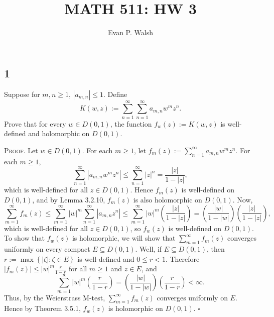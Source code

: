 \documentclass[12pt]{article}
\title{MATH 511: HW 3}
\author{Evan P. Walsh}
\newcounter{ProofCounter}
\newenvironment{Proof}{\stepcounter{ProofCounter}\textsc{Proof.}}{\hfill$\square$}
\begin{document}
\maketitle

\subsection*{1}
\begin{tcolorbox}
Suppose for $m,n \geq 1$, $|a_{m,n}| \leq 1$. Define 
\[ K(w,z) := \sum_{n=1}^{\infty}\sum_{n=1}^{\infty}a_{m,n}w^{m}z^{n}. \]
Prove that for every $w \in D(0,1)$, the function $f_{w}(z) := K(w,z)$ is well-defined and holomorphic on $D(0,1)$.
\end{tcolorbox}
\begin{Proof}
Let $w \in D(0,1)$. For each $m \geq 1$, let $f_{m}(z) := \sum_{n=1}^{\infty}a_{m,n}w^{m}z^{n}$. For each $m \geq 1$,
\[ \sum_{n=1}^{\infty}|a_{m,n}w^{m}z^{n}| \leq \sum_{n=1}^{\infty}|z|^{n} = \frac{|z|}{1 - |z|}, \]
which is well-defined for all $z \in D(0,1)$. Hence $f_{m}(z)$ is well-defined on $D(0,1)$, and by Lemma 3.2.10, $f_{m}(z)$ is also holomorphic on
$D(0,1)$. Now,
\[ \sum_{m=1}^{\infty}f_{m}(z) \leq \sum_{m=1}^{\infty}|w|^{m}\sum_{n=1}^{\infty}|a_{m,n}z^{n}| \leq \sum_{m=1}^{\infty}|w|^{m}\left( \frac{|z|}{1 -
|z|} \right) = \left( \frac{|w|}{1 - |w|} \right)\left( \frac{|z|}{1 - |z|} \right), \]
which is well-defined for all $z \in D(0,1)$, so $f_{w}(z)$ is well-defined on $D(0,1)$. To show that $f_{w}(z)$ is holomorphic, we will show that
$\sum_{m=1}^{\infty}f_{m}(z)$ converges uniformly on every compact $E \subseteq D(0,1)$. Well, if $E \subseteq D(0,1)$, then 
$r := \max\left\{ |\zeta| : \zeta \in E \right\}$ is well-defined and $0 \leq r < 1$. Therefore $|f_{m}(z)| \leq |w|^{m}\frac{r}{1-r}$ for all $m \geq
1$ and $z \in E$, and 
\[ \sum_{m=1}^{\infty}|w|^{m}\left( \frac{r}{1-r} \right) = \left( \frac{|w|}{1 - |w|} \right)\left( \frac{r}{1-r}\right) < \infty. \]
Thus, by the Weierstrass M-test, $\sum_{m=1}^{\infty}f_{m}(z)$ converges uniformly on $E$. Hence by Theorem 3.5.1, $f_{w}(z)$ is holomorphic on
$D(0,1)$.
\end{Proof}


\newpage
\end{document}

